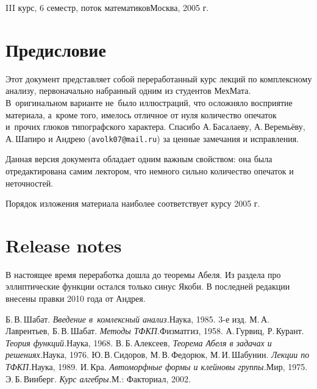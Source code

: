 \documentclass[a4paper]{article}
\begin{document}
{III курс, 6 семестр, поток математиков}{Москва, 2005 г.}

\pagebreak
\tableofcontents

\pagebreak

\section*{Предисловие}

Этот документ представляет собой переработанный курс лекций по комплексному анализу, первоначально набранный
одним из студентов МехМата. В~оригинальном варианте не~было иллюстраций, что осложняло восприятие материала,
а~кроме того, имелось отличное от нуля количество опечаток и~прочих глюков типографского характера. Спасибо
А.\,Басалаеву, А.\,Веремьёву, А.\,Шапиро и Андрею (\texttt{avolk07@mail.ru}) за ценные замечания и исправления.

Данная версия документа обладает одним важным свойством: она была отредактирована самим лектором, что немного
сильно количество опечаток  и неточностей.

Порядок изложения материала наиболее соответствует курсу 2005 г.

\section*{Release notes}

В настоящее время переработка дошла до теоремы Абеля.
Из раздела про эллиптические функции остался только синус Якоби.
В последней редакции внесены правки 2010 года от Андрея.

\medskip
\dmvntrail


\begin{thebibliography}{4}
\setlength\itemsep{-.5mm}
Б.\,В.\,Шабат. \emph{Введение в~комлексный анализ.}\т Наука, 1985. 3-е изд.
 М.\,А.\,Лаврентьев, Б.\,В.\,Шабат. \emph{Методы ТФКП.}\т Физматгиз, 1958.
 А.\,Гурвиц, Р.\,Курант. \emph{Теория функций.}\т Наука, 1968.
 В.\,Б.\,Алексеев, \emph{Теорема Абеля в задачах и решениях.}\т Наука, 1976.
 Ю.\,В.\,Сидоров, М.\,В.\,Федорюк, М.\,И.\,Шабунин. \emph{Лекции по ТФКП.}\т Наука, 1989.
 И.\,Кра. \emph{Автоморфные формы и клейновы группы.}\т Мир, 1975.
 Э.\,Б.\,Винберг. \emph{Курс алгебры.}\т М.: Факториал, 2002.
\end{thebibliography}
\end{document}
